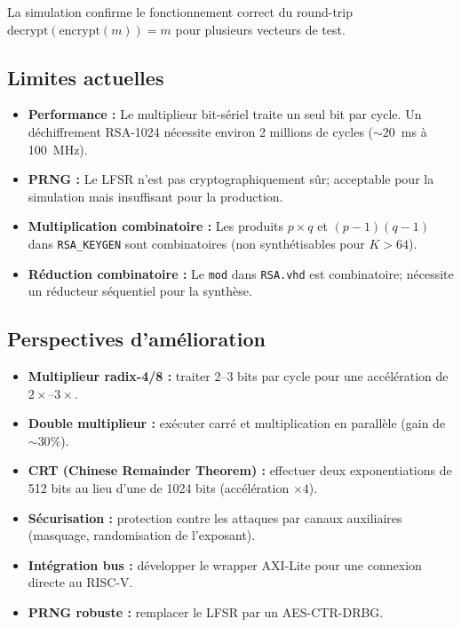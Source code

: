 La simulation confirme le fonctionnement correct du round-trip
$\text{decrypt}(\text{encrypt}(m)) = m$ pour plusieurs vecteurs de test.


\subsection{Limites actuelles}
\begin{itemize}
  \item \textbf{Performance :} Le multiplieur bit-sériel traite un seul
        bit par cycle. Un déchiffrement RSA-1024 nécessite environ
        2 millions de cycles ($\sim 20$~ms à 100~MHz).
  \item \textbf{PRNG :} Le LFSR n'est pas cryptographiquement sûr;
        acceptable pour la simulation mais insuffisant pour la production.
  \item \textbf{Multiplication combinatoire :} Les produits $p \times q$
        et $(p-1)(q-1)$ dans \texttt{RSA\_KEYGEN} sont combinatoires
        (non synthétisables pour $K > 64$).
  \item \textbf{Réduction combinatoire :} Le \texttt{mod} dans
        \texttt{RSA.vhd} est combinatoire; nécessite un réducteur
        séquentiel pour la synthèse.
\end{itemize}

\subsection{Perspectives d'amélioration}
\begin{itemize}
  \item \textbf{Multiplieur radix-4/8 :} traiter 2--3 bits par cycle
        pour une accélération de $2\times$--$3\times$.
  \item \textbf{Double multiplieur :} exécuter carré et multiplication
        en parallèle (gain de $\sim 30\%$).
  \item \textbf{CRT (Chinese Remainder Theorem) :} effectuer deux
        exponentiations de 512 bits au lieu d'une de 1024 bits
        (accélération $\times 4$).
  \item \textbf{Sécurisation :} protection contre les attaques par
        canaux auxiliaires (masquage, randomisation de l'exposant).
  \item \textbf{Intégration bus :} développer le wrapper AXI-Lite
        pour une connexion directe au RISC-V.
  \item \textbf{PRNG robuste :} remplacer le LFSR par un AES-CTR-DRBG.
\end{itemize}

